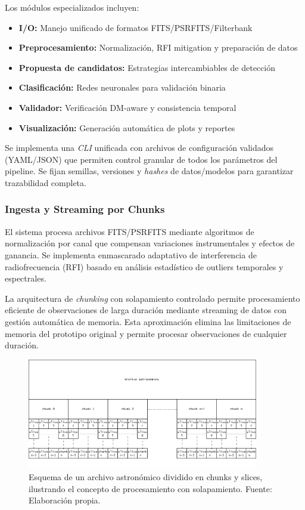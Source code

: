 Los módulos especializados incluyen:
\begin{itemize}
\item \textbf{I/O:} Manejo unificado de formatos FITS/PSRFITS/Filterbank
\item \textbf{Preprocesamiento:} Normalización, RFI mitigation y preparación de datos
\item \textbf{Propuesta de candidatos:} Estrategias intercambiables de detección
\item \textbf{Clasificación:} Redes neuronales para validación binaria
\item \textbf{Validador:} Verificación DM-aware y consistencia temporal
\item \textbf{Visualización:} Generación automática de plots y reportes
\end{itemize}

Se implementa una \textit{CLI} unificada con archivos de configuración validados (YAML/JSON) que permiten control granular de todos los parámetros del pipeline. Se fijan semillas, versiones y \textit{hashes} de datos/modelos para garantizar trazabilidad completa.

\subsubsection{Ingesta y Streaming por Chunks}

El sistema procesa archivos FITS/PSRFITS mediante algoritmos de normalización por canal que compensan variaciones instrumentales y efectos de ganancia. Se implementa enmascarado adaptativo de interferencia de radiofrecuencia (RFI) basado en análisis estadístico de outliers temporales y espectrales. 

La arquitectura de \emph{chunking} con solapamiento controlado permite procesamiento eficiente de observaciones de larga duración mediante streaming de datos con gestión automática de memoria. Esta aproximación elimina las limitaciones de memoria del prototipo original y permite procesar observaciones de cualquier duración.

\begin{figure}[H]
\centering
\includegraphics[width=0.9\textwidth]{figures/sistema-chunks.png}
\caption{Esquema de un archivo astronómico dividido en chunks y slices, ilustrando el concepto de procesamiento con solapamiento. Fuente: Elaboración propia.}
\label{fig:sistema-chunks}
\end{figure}

